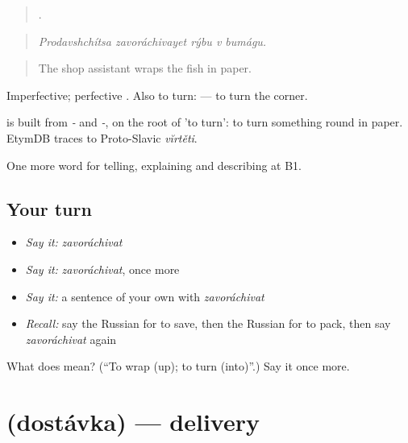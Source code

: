 \begin{quote}
    .
\end{quote}

\begin{quote}
\emph{Prodavshchítsa zavoráchivayet rýbu v bumágu.}
\end{quote}

\begin{quote}
The shop assistant wraps the fish in paper.
\end{quote}

Imperfective; perfective \emph{}. Also to turn: \emph{  } — to turn the corner.

\begin{cousinweb}
\emph{} is built from \emph{-} and \emph{-}, on the root of \emph{} 'to turn': to turn something round in paper. EtymDB traces \emph{} to Proto-Slavic \emph{vĭrtěti}.
\end{cousinweb}

\begin{grammarlens}[title={What you've built}]
One more word for telling, explaining and describing at B1.
\end{grammarlens}

\subsection*{Your turn}
\begin{itemize}
\raggedright
  \item \emph{Say it:} \emph{zavoráchivat}
  \item \emph{Say it:} \emph{zavoráchivat}, once more
  \item \emph{Say it:} a sentence of your own with \emph{zavoráchivat}
  \item \emph{Recall:} say the Russian for to save, then the Russian for to pack, then say \emph{zavoráchivat} again
\end{itemize}

\begin{tcolorbox}[breakable,colback=teal!4,colframe=teal!35!black,title={Before you move on}]
What does  mean? (\textquotedblleft{}To wrap (up); to turn (into)\textquotedblright{}.) Say it once more.
\end{tcolorbox}
\section[\texorpdfstring{\ru{доставка} (dostávka)}{доставка (dostávka)}]{ (dostávka) — delivery}

